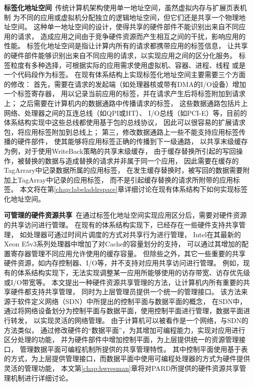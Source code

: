 \textbf{标签化地址空间}\ 传统计算机架构使用单一地址空间，虽然虚拟内存与扩展页表机制
为不同的应用或虚拟机分配独立的逻辑地址空间，但它们还是共享一个物理地址空间。
这种单一地址空间的设计，使得共享的硬件部件不能识别出来自不同应用的请求，
造成应用之间由于竞争硬件资源而产生相互之间的干扰，影响应用的性能。
标签化地址空间是指让计算内所有的请求都携带应用的标签信息，
让共享的硬件部件能够识别出来自不同应用的请求，以实现应用之间的区分化服务。
标签粒度有多种选择，可根据实际的应用需求使用虚拟机、容器、进程、线程
或是一个代码段作为标签。
在现有体系结构上实现标签化地址空间主要需要三个方面的修改：
首先，需要在请求的发起端（如处理器核或带有DMA的I/O设备）增加一个标签寄存器，
用以记录当前应用的标签，并在请求产生后将标签附加到请求上；
之后需要在计算机内的数据通路中传播请求的标签，
这些数据通路包括片上网络、处理器之间的互连总线（如QPI或HT）、
I/O总线（如PCI-E）等，目前的体系结构实现中这些总线都使用基于包的总线协议，
因此可以很容易的扩展请求包，将应用标签附加到总线上；
第三，修改数据通路上一些不能支持应用标签传播的硬件部件，
使其能够将应用标签正确的传播到下一级通路，
以共享末级缓存为例，对于使用WriteBack策略的共享末级缓存，
由于缓存替换所引起的写回操作，被替换的数据与造成替换的请求并非属于同一个应用，
因此需要在缓存的TagArrary中记录数据所属的应用标签，
在发生缓存替换时，被写回的数据需要附加上TagArray中记录的应用标签，
而不是引起缓存替换的请求所附带的应用标签。
本文将在第\ref{chap:labeladdrspace}章详细讨论在现有体系结构下如何实现标签化地址空间。


\textbf{可管理的硬件资源共享}\ 在通过标签化地址空间实现应用区分后，需要对硬件资源的共享访问进行管理。
在现有的体系结构实现下，已经存在一些硬件支持共享管理，
如处理器可通过时间片调度的方式对共享行为进行管理，
Intel在其最新的Xeon E5v3系列处理器中增加了对Cache的容量划分的支持\cite{intel-cat}，
可以通过其增加的配置寄存器管理不同应用允许使用的缓存容量。
但除些之外，其它一些重要的共享硬件资源，如内存控制器、I/O等，并不支持对应用共享访问进行管理。
例如，现有的体系结构实现下，无法实现调整某一应用所能够使用的访存带宽、访存优先级或I/O带宽等。
本文提出一种硬件资源共享管理的方法，让计算机内所有重要的共享硬件都支持共享管理，
同时为上层管理员提供一个统一的管理接口。
该方法来源于软件定义网络（SDN）中所提出的控制平面与数据平面的概念，
在SDN中，通过将网络设备划分为控制平面与数据平面，使用控制平面进行管理，数据平面进行转发，
以实现灵活的网络管理。
由于计算机可以被看作是一个网络，与SDN的方法类似，
通过修改硬件的“数据平面”，为其增加可编程能力，实现对应用进行区分处理的功能，
并为硬件部件中增加控制平面，为上层提供统一的资源管理接口，
管理数据平面可编程机制所提供的共享管理特性。
其中控制平面使用基于表的方式，为上层提供管理接口，而数据平面中使用可编程处理器的方式为硬件提供灵活的管理功能，
本文第\ref{chap:hwresman}章将对PARD所提供的硬件资源共享管理机制进行详细讨论。


